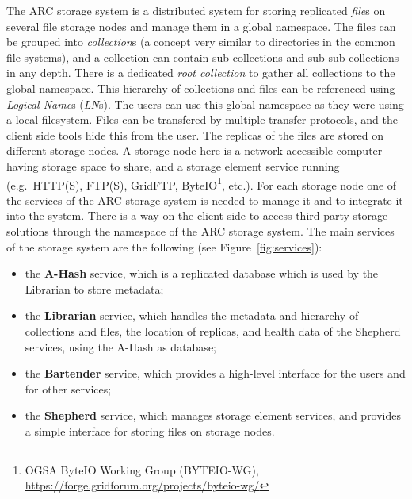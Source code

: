 \documentclass{book}
\begin{document}
The ARC storage system is a distributed system for storing replicated \emph{file}s on several file storage nodes and manage them in a global namespace.  The files can be grouped into \emph{collection}s (a concept very similar to directories in the common file systems), and a collection can contain sub-collections and sub-sub-collections in any depth. There is a dedicated \emph{root collection} to gather all collections to the global namespace. This hierarchy of collections and files can be referenced using \emph{Logical Name}s (\emph{LN}s). The users can use this global namespace as they were using a local filesystem. Files can be transfered by multiple transfer protocols, and the client side tools hide this from the user. The replicas of the files are stored on different storage nodes. A storage node here is a network-accessible computer having storage space to share, and a storage element service running (e.g.~HTTP(S), FTP(S), GridFTP, ByteIO\footnote{OGSA ByteIO Working Group (BYTEIO-WG), \url{https://forge.gridforum.org/projects/byteio-wg/}}, etc.). For each storage node one of the services of the ARC storage system is needed to manage it and to integrate it into the system. There is a way on the client side to access third-party storage solutions through the namespace of the ARC storage system. The main services of the storage system are the following (see Figure~\ref{fig:services}):
\begin{itemize}
    \item the \textbf{A-Hash} service, which is a replicated database which is used by the Librarian to store metadata;
    \item the \textbf{Librarian} service, which handles the metadata and hierarchy of collections and files, the location of replicas, and health data of the Shepherd services, using the A-Hash as database;
    \item the \textbf{Bartender} service, which provides a high-level interface for the users and for other services;
    \item the \textbf{Shepherd} service, which manages storage element services, and provides a simple interface for storing files on storage nodes.
\end{itemize}
\end{document}
